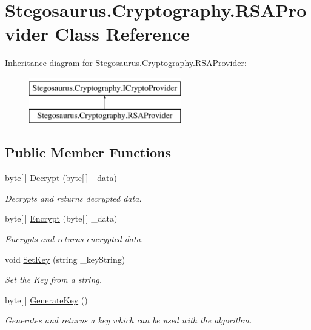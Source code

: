 \hypertarget{class_stegosaurus_1_1_cryptography_1_1_r_s_a_provider}{}\section{Stegosaurus.\+Cryptography.\+R\+S\+A\+Provider Class Reference}
\label{class_stegosaurus_1_1_cryptography_1_1_r_s_a_provider}
Inheritance diagram for Stegosaurus.\+Cryptography.\+R\+S\+A\+Provider\+:\begin{figure}[H]
\begin{center}
\leavevmode
\includegraphics[height=2.000000cm]{class_stegosaurus_1_1_cryptography_1_1_r_s_a_provider}
\end{center}
\end{figure}
\subsection*{Public Member Functions}
\begin{DoxyCompactItemize}
\item 
byte\mbox{[}$\,$\mbox{]} \hyperlink{class_stegosaurus_1_1_cryptography_1_1_r_s_a_provider_ae5bf59d4baa636c5b3639cc24e240468}{Decrypt} (byte\mbox{[}$\,$\mbox{]} \+\_\+data)
\begin{DoxyCompactList}\small\item\em Decrypts and returns decrypted data. \end{DoxyCompactList}\item 
byte\mbox{[}$\,$\mbox{]} \hyperlink{class_stegosaurus_1_1_cryptography_1_1_r_s_a_provider_aa3b8f1d8c55043ca741b4ec3fd456836}{Encrypt} (byte\mbox{[}$\,$\mbox{]} \+\_\+data)
\begin{DoxyCompactList}\small\item\em Encrypts and returns encrypted data. \end{DoxyCompactList}\item 
void \hyperlink{class_stegosaurus_1_1_cryptography_1_1_r_s_a_provider_a18053ea1b1d9709c8631e97bef06c6a8}{Set\+Key} (string \+\_\+key\+String)
\begin{DoxyCompactList}\small\item\em Set the Key from a string. \end{DoxyCompactList}\item 
byte\mbox{[}$\,$\mbox{]} \hyperlink{class_stegosaurus_1_1_cryptography_1_1_r_s_a_provider_abf0779c0e2d3d295385af554c1776bc5}{Generate\+Key} ()
\begin{DoxyCompactList}\small\item\em Generates and returns a key which can be used with the algorithm. \end{DoxyCompactList}\end{DoxyCompactItemize}
